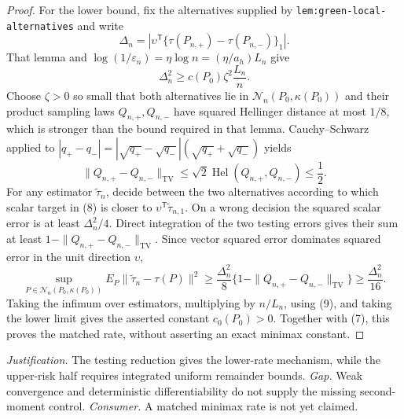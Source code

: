 \documentclass{article}
\begin{document}
\begin{proof}
For the lower bound, fix the alternatives supplied by \texttt{lem:green-local-alternatives} and write
\[
 \Delta_n=\left|\upsilon^{\mathsf T}
 \{\tau(P_{n,+})-\tau(P_{n,-})\}_1\right|.                           \tag{8}
\]
That lemma and
\(\log(1/\varepsilon_n)=\eta\log n=(\eta/a_h)L_n\) give
\[
 \Delta_n^2\geq c(P_0)\zeta^2\frac{L_n}{n}.                          \tag{9}
\]
Choose \(\zeta>0\) so small that both alternatives lie in
\(\mathcal N_n(P_0,\kappa(P_0))\) and their product sampling laws
\(Q_{n,+},Q_{n,-}\) have squared Hellinger distance at most \(1/8\), which is stronger than the bound required in that lemma.  Cauchy--Schwarz applied to
\(|q_+-q_-|=|\sqrt{q_+}-\sqrt{q_-}|(\sqrt{q_+}+\sqrt{q_-})\) yields
\[
 \|Q_{n,+}-Q_{n,-}\|_{\mathrm{TV}}
 \leq\sqrt2\operatorname{Hel}(Q_{n,+},Q_{n,-})\leq\frac12.           \tag{10}
\]
For any estimator \(\widetilde\tau_n\), decide between the two alternatives according to which scalar target in (8) is closer to
\(\upsilon^{\mathsf T}\widetilde\tau_{n,1}\).  On a wrong decision the squared scalar error is at least \(\Delta_n^2/4\).  Direct integration of the two testing errors gives their sum at least
\(1-\|Q_{n,+}-Q_{n,-}\|_{\mathrm{TV}}\).  Since vector squared error dominates squared error in the unit direction \(\upsilon\),
\[
 \sup_{P\in\mathcal N_n(P_0,\kappa(P_0))}
 E_P\|\widetilde\tau_n-\tau(P)\|^2
 \geq\frac{\Delta_n^2}{8}
 \{1-\|Q_{n,+}-Q_{n,-}\|_{\mathrm{TV}}\}
 \geq\frac{\Delta_n^2}{16}.                                         \tag{11}
\]
Taking the infimum over estimators, multiplying by \(n/L_n\), using (9), and taking the lower limit gives the asserted constant \(c_0(P_0)>0\).  Together with (7), this proves the matched rate, without asserting an exact minimax constant.
\end{proof}
\par\smallskip\noindent \textit{Justification.} The testing reduction gives the lower-rate mechanism, while the upper-risk half requires integrated uniform remainder bounds. \textit{Gap.} Weak convergence and deterministic differentiability do not supply the missing second-moment control. \textit{Consumer.} A matched minimax rate is not yet claimed.
\end{document}
